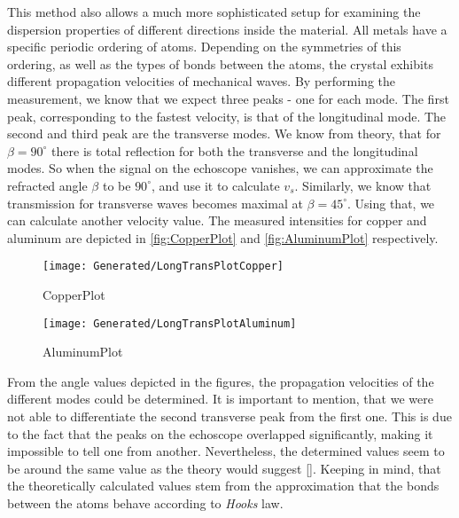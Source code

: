\documentclass[a4paper,10pt,twocolumn]{article}
\begin{document}
    This method also allows a much more sophisticated setup for examining the dispersion properties of different directions inside the material.
    All metals have a specific periodic ordering of atoms.
    Depending on the symmetries of this ordering, as well as the types of bonds between the atoms, the crystal exhibits different propagation velocities of mechanical waves.
    By performing the measurement, we know that we expect three peaks - one for each mode.
    The first peak, corresponding to the fastest velocity, is that of the longitudinal mode.
    The second and third peak are the transverse modes.
    We know from theory, that for $\beta = 90^\circ$ there is total reflection for both the transverse and the longitudinal modes.
    So when the signal on the echoscope vanishes, we can approximate the refracted angle $\beta$ to be $90^\circ $, and use it to calculate $v_s$.
    Similarly, we know that transmission for transverse waves becomes maximal at $\beta = 45^\circ $.
    Using that, we can calculate another velocity value.
    The measured intensities for copper and aluminum are depicted in \autoref{fig:CopperPlot} and \autoref{fig:AluminumPlot} respectively.
    \begin{figure}
        \begin{center}
            \texttt{[image: Generated/LongTransPlotCopper]}
            \caption[]{CopperPlot}
            \label{fig:CopperPlot}
        \end{center}
    \end{figure}
    \begin{figure}
        \begin{center}
            \texttt{[image: Generated/LongTransPlotAluminum]}
            \caption[]{AluminumPlot}
            \label{fig:AluminumPlot}
        \end{center}
    \end{figure}
    From the angle values depicted in the figures, the propagation velocities of the different modes could be determined.
    It is important to mention, that we were not able to differentiate the second transverse peak from the first one.
    This is due to the fact that the peaks on the echoscope overlapped significantly, making it impossible to tell one from another.
    Nevertheless, the determined values seem to be around the same value as the theory would suggest \autoref{}.
    Keeping in mind, that the theoretically calculated values stem from the approximation that the bonds between the atoms behave according to \textit{Hooks} law.
    
\end{document}
